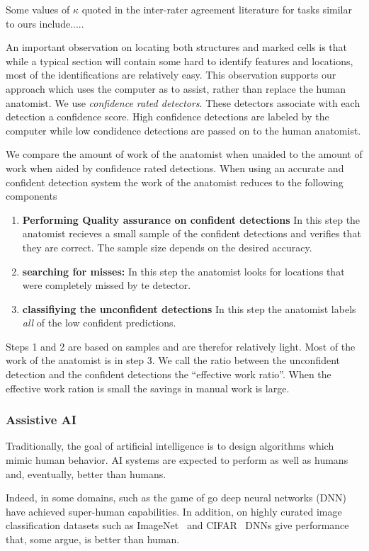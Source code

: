 \documentclass[11pt]{article}
\begin{document}
Some values of $\kappa$ quoted in the inter-rater agreement literature
for tasks similar to ours include.....

  An important observation on locating both structures and marked cells
is that while a typical section will contain some hard to identify
features and locations, most of the identifications are relatively
easy. This observation supports our approach which uses the computer as
to assist, rather than replace the human anatomist. We
use {\em confidence rated detectors}. These detectors
associate with each detection a confidence score. High confidence
detections are labeled by the computer while low condidence detections
are passed on to the human anatomist.

We compare the amount of work of the anatomist when unaided to the
amount of work when aided by confidence rated detections.
When using an accurate and confident detection system the work of the
anatomist reduces to the following components
\begin{enumerate}
\item {\bf Performing Quality assurance on confident detections} In this step the
  anatomist recieves a small sample of the confident detections and
  verifies that they are correct. The sample size depends on the
  desired accuracy.
\item {\bf searching for misses:} In this step the anatomist looks
  for locations that were completely missed by te detector.
\item {\bf classifiying the unconfident detections} In this step
  the anatomist labels {\em all} of the low confident predictions.
  \end{enumerate}
Steps 1 and 2 are based on samples and are therefor relatively light.
Most of the work of the anatomist is in step 3. We call the ratio
between the unconfident detection and the confident detections the 
``effective work ratio''. When the effective work ration is small the
savings in manual work is large.
  
\subsubsection{Assistive AI} Traditionally, the goal of artificial
  intelligence is to design algorithms which mimic human behavior. AI
  systems are expected to perform as well as humans and, eventually,
  better than humans.

Indeed, in some domains, such as the game of go \cite{silver2017mastering} deep neural
networks (DNN)  have achieved super-human capabilities. In addition,
on highly curated image classification datasets such as ImageNet~\cite{deng2009imagenet} and
CIFAR~\cite{krizhevsky2009learning} DNNs give performance that, some argue, is better than
human. 
\end{document}
